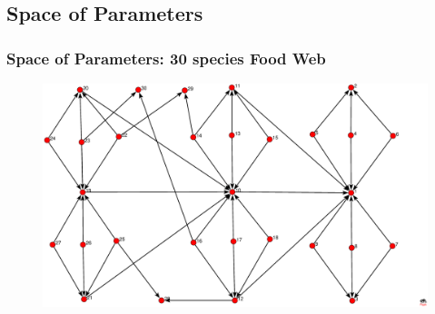 \documentclass[xcolor=x11names,compress]{beamer}
\renewcommand{\(}{\begin{columns}}
\renewcommand{\)}{\end{columns}}
\newcommand{\<}[1]{\begin{column}{#1}}
\renewcommand{\>}{\end{column}}
\begin{document}
\subsection{Space of Parameters}
\begin{frame}
\frametitle{Space of Parameters: 30 species Food Web}
\begin{figure}
  \includegraphics[width=1.0\textwidth]{./FoodWeb_30bloques9.eps}
\end{figure}
\end{frame}
\end{document}
